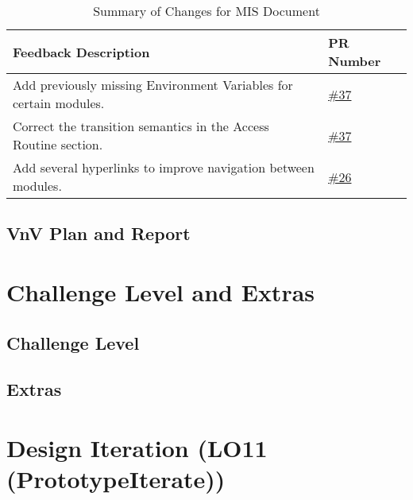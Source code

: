 \documentclass{article}
\begin{document}
\begin{table}[ht] 
\centering 
\begin{tabular}{|p{8cm}|p{2.5cm}|} 
\hline
\textbf{Feedback Description} & \textbf{PR Number} \\
\hline 
Add previously missing Environment Variables for certain modules. &
\href{https://github.com/Lychee-acaca/CAS741/pull/37}{\#37} \\
\hline 
Correct the transition semantics in the Access Routine section. &
\href{https://github.com/Lychee-acaca/CAS741/pull/37}{\#37} \\
\hline 
Add several hyperlinks to improve navigation between modules. &
\href{https://github.com/Lychee-acaca/CAS741/pull/26}{\#26} \\
\hline 
\end{tabular} 
\caption{Summary of Changes for MIS Document} 
\label{tab:MIS}
\end{table}

\subsection{VnV Plan and Report}

\section{Challenge Level and Extras}

\subsection{Challenge Level}


\subsection{Extras}


\section{Design Iteration (LO11 (PrototypeIterate))}
\end{document}
